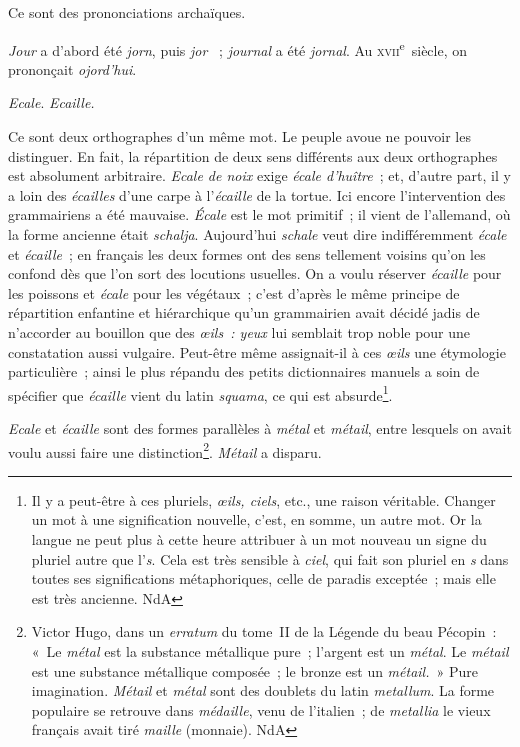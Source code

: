 \documentclass[french,twoside]{book} %
\begin{document}
\noindent Ce sont des prononciations archaïques.\par
{\itshape Jour} a d’abord été {\itshape jorn}, puis {\itshape jor}  ; {\itshape journal} a été {\itshape jornal}. Au \textsc{xvii}\textsuperscript{e} siècle, on prononçait {\itshape ojord’hui}.\par
{\itshape Ecale}. {\itshape Ecaille.}\par
Ce sont deux orthographes d’un même mot. Le peuple avoue ne pouvoir les distinguer. En fait, la répartition de deux sens différents aux deux orthographes est absolument arbitraire. {\itshape Ecale de noix} exige {\itshape écale d’huître} ; et, d’autre part, il y a loin des {\itshape écailles} d’une carpe à l’{\itshape écaille} de la tortue. Ici encore l’intervention des grammairiens a été mauvaise. {\itshape Écale} est le mot primitif ; il vient de l’allemand, où la forme ancienne était {\itshape schalja}. Aujourd’hui {\itshape schale} veut dire indifféremment {\itshape écale} et {\itshape écaille} ; en français les deux formes ont des sens tellement voisins qu’on les confond dès que l’on sort des locutions usuelles. On a voulu réserver {\itshape écaille} pour les poissons et {\itshape écale} pour les végétaux ; c’est d’après le même principe de répartition enfantine et hiérarchique qu’un grammairien avait décidé jadis de n’accorder au bouillon que des {\itshape œils : yeux} lui semblait trop noble pour une constatation aussi vulgaire. Peut-être même assignait-il à ces {\itshape œils} une étymologie particulière ; ainsi le plus répandu des petits dictionnaires manuels a soin de spécifier que {\itshape écaille} vient du latin {\itshape squama}, ce qui est absurde\footnote{ Il y a peut-être à ces pluriels, {\itshape œils, ciels}, etc., une raison véritable. Changer un mot à une signification nouvelle, c’est, en somme, un autre mot. Or la langue ne peut plus à cette heure attribuer à un mot nouveau un signe du pluriel autre que l’{\itshape s}. Cela est très sensible à {\itshape ciel}, qui fait son pluriel en {\itshape s} dans toutes ses significations métaphoriques, celle de paradis exceptée ; mais elle est très ancienne. NdA}.\par
\par
{\itshape Ecale} et {\itshape écaille} sont des formes parallèles à {\itshape métal} et {\itshape métail}, entre lesquels on avait voulu aussi faire une distinction\footnote{ Victor Hugo, dans un {\itshape erratum} du tome II de la Légende du beau Pécopin : « Le {\itshape métal} est la substance métallique pure ; l’argent est un {\itshape métal}. Le {\itshape métail} est une substance métallique composée ; le bronze est un {\itshape métail.} » Pure imagination. {\itshape Métail} et {\itshape métal} sont des doublets du latin {\itshape metallum}. La forme populaire se retrouve dans {\itshape médaille}, venu de l’italien ; de {\itshape metallia} le vieux français avait tiré {\itshape maille} (monnaie). NdA}. {\itshape Métail} a disparu.\par
\end{document}
